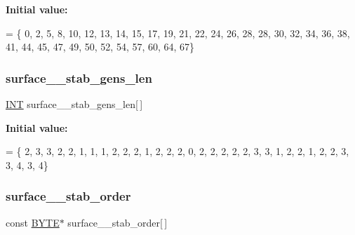{\bfseries Initial value\+:}
\begin{DoxyCode}
= \{ 0, 2, 5, 8, 10, 12, 13, 14, 15, 17, 
    19, 21, 22, 24, 26, 28, 28, 30, 32, 34, 
    36, 38, 41, 44, 45, 47, 49, 50, 52, 54, 
    57, 60, 64, 67\}
\end{DoxyCode}
\mbox{\label{surface__29_8_c_abfec305fb81f4bf0351a0d45f1293ac8}} 
\subsubsection{\texorpdfstring{surface\+\_\+\_\+stab\+\_\+gens\+\_\+len}{surface\_29\_stab\_gens\_len}}
{\footnotesize\ttfamily \mbox{\hyperlink{galois_8h_a09fddde158a3a20bd2dcadb609de11dc}{I\+NT}} surface\+\_\+\_\+stab\+\_\+gens\+\_\+len\mbox{[}$\,$\mbox{]}}

{\bfseries Initial value\+:}
\begin{DoxyCode}
= \{ 2, 3, 3, 2, 2, 1, 1, 1, 2, 2, 
    2, 1, 2, 2, 2, 0, 2, 2, 2, 2, 
    2, 3, 3, 1, 2, 2, 1, 2, 2, 3, 
    3, 4, 3, 4\}
\end{DoxyCode}
\mbox{\label{surface__29_8_c_ac0c76438afe851ebc37d19edd39cd4e8}} 
\subsubsection{\texorpdfstring{surface\+\_\+\_\+stab\+\_\+order}{surface\_29\_stab\_order}}
{\footnotesize\ttfamily const \mbox{\hyperlink{galois_8h_ab6cc7b4aeb6ea31aba2b3fbfc83ff5e6}{B\+Y\+TE}}$\ast$ surface\+\_\+\_\+stab\+\_\+order\mbox{[}$\,$\mbox{]}}

